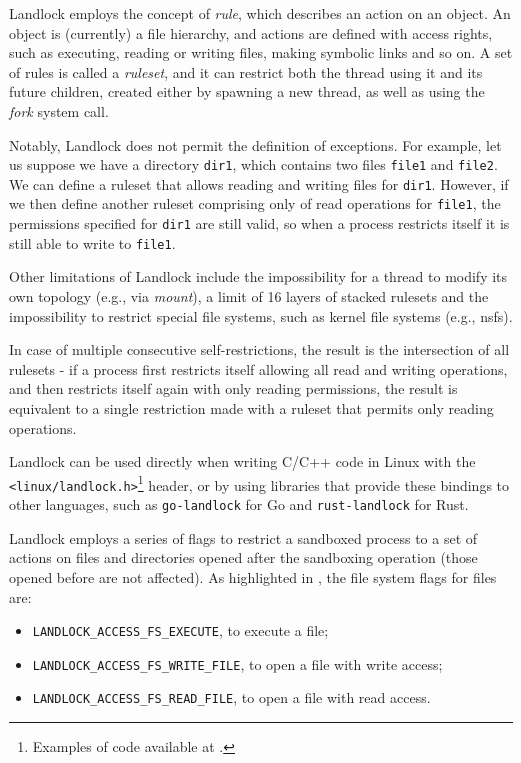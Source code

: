 Landlock employs the concept of \textit{rule}, which describes an action
on an object. An object is (currently) a file hierarchy, and actions are
defined with access rights, such as executing, reading or writing files, making
symbolic links and so on.
A set of rules is called a \textit{ruleset}, and it can restrict both the thread
using it and its future children, created either by spawning a new thread, as well
as using the \textit{fork} system call.

Notably, Landlock does not permit the definition of exceptions.
For example, let us suppose we have a directory \texttt{dir1}, which contains two files
\texttt{file1} and \texttt{file2}. We can define a ruleset that allows
reading and writing files for \texttt{dir1}.
However, if we then define another ruleset comprising only of read operations
for \texttt{file1}, the permissions specified for \texttt{dir1} are still
valid, so when a process restricts itself it is still able to write to \texttt{file1}.

Other limitations of Landlock include the impossibility for a thread to modify its own topology
(e.g., via \textit{mount}), a limit of 16 layers of stacked rulesets and the impossibility to
restrict special file systems, such as kernel file systems (e.g., nsfs).

In case of multiple consecutive self-restrictions, the result is the intersection
of all rulesets - if a process first restricts itself allowing all read and writing operations,
and then restricts itself again with only reading permissions, the result is equivalent
to a single restriction made with a ruleset that permits only reading operations.

Landlock can be used directly when writing C/C++ code in Linux with the
\texttt{<linux/landlock.h>}\footnote{Examples of code available at \cite{landlock-user-space}.}
header, or by using libraries that provide these bindings to other languages,
such as \texttt{go-landlock} \cite{go-landlock}
for Go and \texttt{rust-landlock} \cite{rust-landlock} for Rust.

Landlock employs a series of flags to restrict a sandboxed process to a set of actions on files and
directories opened after the sandboxing operation (those opened before are not affected).
As highlighted in \cite{landlock-user-space}, the file system flags for files are:
\begin{itemize}
  \item \texttt{LANDLOCK\_ACCESS\_FS\_EXECUTE}, to execute a file;
  \item \texttt{LANDLOCK\_ACCESS\_FS\_WRITE\_FILE}, to open a file with write access;
  \item \texttt{LANDLOCK\_ACCESS\_FS\_READ\_FILE}, to open a file with read access.
\end{itemize}

